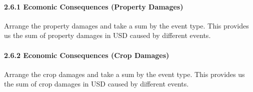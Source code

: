 \documentclass[]{article}
\newenvironment{Shaded}{\begin{snugshade}}{\end{snugshade}}
\newcommand{\DataTypeTok}[1]{\textcolor[rgb]{0.13,0.29,0.53}{#1}}
\newcommand{\DecValTok}[1]{\textcolor[rgb]{0.00,0.00,0.81}{#1}}
\newcommand{\KeywordTok}[1]{\textcolor[rgb]{0.13,0.29,0.53}{\textbf{#1}}}
\newcommand{\NormalTok}[1]{#1}
\newcommand{\OperatorTok}[1]{\textcolor[rgb]{0.81,0.36,0.00}{\textbf{#1}}}
\newcommand{\OtherTok}[1]{\textcolor[rgb]{0.56,0.35,0.01}{#1}}
\newcommand{\StringTok}[1]{\textcolor[rgb]{0.31,0.60,0.02}{#1}}
\let\oldparagraph\paragraph
\renewcommand{\paragraph}[1]{\oldparagraph{#1}\mbox{}}
\begin{document}
\hypertarget{ecomonic-consequences-property-damages}{%
\paragraph{2.6.1 Ecomonic Consequences (Property
Damages)}\label{ecomonic-consequences-property-damages}}

Arrange the property damages and take a sum by the event type. This
provides us the sum of property damages in USD caused by different
events.

\begin{Shaded}
\end{Shaded}

\hypertarget{economic-consequences-crop-damages}{%
\paragraph{2.6.2 Economic Consequences (Crop
Damages)}\label{economic-consequences-crop-damages}}

Arrange the crop damages and take a sum by the event type. This provides
us the sum of crop damages in USD caused by different events.

\begin{Shaded}
\end{Shaded}
\end{document}
